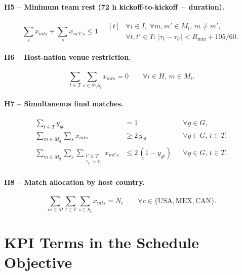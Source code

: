 \documentclass[12pt, letterpaper]{article}
\begin{document}
\paragraph{H5 -- Minimum team rest (72 h kickoff-to-kickoff $+$ duration).}
\begin{equation}
\sum_{s} x_{mts}+\sum_{s} x_{m't's}\le 1
  \quad
  \begin{aligned}[t]
  &\forall i\in I,\;\forall m,m'\in M_i,\,m\neq m',\\
  &\forall t,t'\in T:\,|\tau_t-\tau_{t'}|<R_{\min}+105/60.
  \end{aligned}
\end{equation}
\paragraph{H6 -- Host-nation venue restriction.}
\begin{equation}
\sum_{t\in T}\sum_{s\in S\setminus S_i} x_{mts}=0
  \qquad\forall i\in H,\,m\in M_i.
\end{equation}
\paragraph{H7 -- Simultaneous final matches.}
\begin{align}
\sum_{t\in T} y_{gt}&=1 &&\forall g\in G,\\
\sum_{m\in M_g}\sum_{s} x_{mts}&\ge 2\,y_{gt} &&\forall g\in G,\,t\in T,\\
\sum_{m\in M_g}\sum_{s}\sum_{\substack{t'\in T\\ \tau_{t'}>\tau_t}} x_{mt's}
  &\le 2\,(1-y_{gt}) &&\forall g\in G,\,t\in T.
\end{align}
\paragraph{H8 -- Match allocation by host country.}
\begin{equation}
\sum_{m\in M}\sum_{t\in T}\sum_{s\in S_c} x_{mts}=N_c
  \qquad\forall c\in\{\mathrm{USA,MEX,CAN}\}.
\end{equation}

\section{KPI Terms in the Schedule Objective}
\label{sec:kpi}
\end{document}
